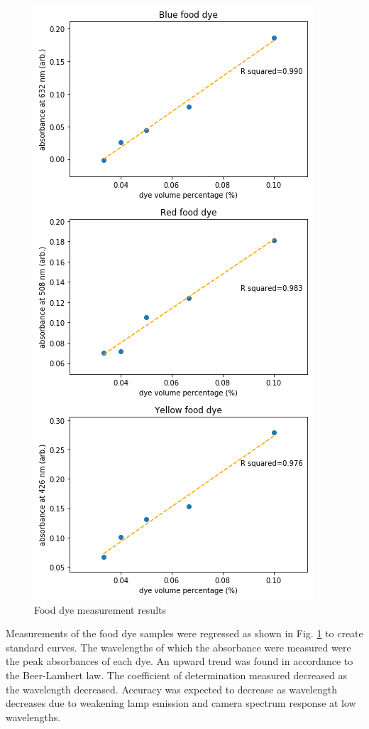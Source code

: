 \documentclass[conference]{IEEEtran}
\begin{document}
\begin{figure}[htbp]
    \centerline{\includegraphics[scale=0.6]{dye-res.png}}
    \caption{Food dye measurement results}
    \label{dye_res}
    \end{figure}

Measurements of the food dye samples were regressed as shown in Fig. \ref{dye_res} to create standard curves.
The wavelengths of which the absorbance were measured were the peak absorbances of each dye.
An upward trend was found in accordance to the Beer-Lambert law.
The coefficient of determination measured decreased as the wavelength decreased.
Accuracy was expected to decrease as wavelength decreases due to weakening lamp emission and camera spectrum response at low wavelengths.
\end{document}
